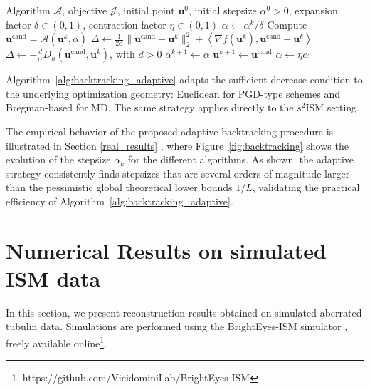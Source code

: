 \documentclass[letterpaper]{article}
\begin{document}
\begin{algorithm}
\caption{Adaptive backtracking (AB)}
\label{alg:backtracking_adaptive}
\begin{algorithmic}[1]
\Require Algorithm $\mathcal A$, objective $\mathcal J$, initial point $\mathbf u^0$, initial stepsize $\alpha^0>0$, expansion factor $\delta\in(0,1)$, contraction factor $\eta\in(0,1)$
    \State $\alpha \gets \alpha^k/\delta$
    \Repeat
        \State Compute $\mathbf u^{\mathrm{cand}}=\mathcal A(\mathbf u^k,\alpha)$
            \State $\Delta \gets \frac{1}{2\alpha}\|\mathbf u^{\mathrm{cand}}-\mathbf u^k\|_2^2
            +\left\langle \nabla f(\mathbf u^k),\mathbf u^{\mathrm{cand}}-\mathbf u^k\right\rangle$
            \State $\Delta \gets -\frac{d}{\alpha}D_h(\mathbf u^{\mathrm{cand}},\mathbf u^k)$, with $d>0$
        \EndIf
            \State $\alpha^{k+1}\gets\alpha$
            \State $\mathbf u^{k+1}\gets\mathbf u^{\mathrm{cand}}$
        \Else
            \State $\alpha\gets\eta\alpha$
        \EndIf
\EndFor
\end{algorithmic}
\end{algorithm}

Algorithm~\ref{alg:backtracking_adaptive} adapts the sufficient decrease condition to the underlying optimization geometry: Euclidean for PGD-type schemes and Bregman-based for MD. The same strategy applies directly to the $s^2$ISM setting. 

The empirical behavior of the proposed adaptive backtracking procedure is illustrated in Section \ref{real_results} , where Figure~\ref{fig:backtracking} shows the evolution of the stepsize $\alpha_k$ for the different algorithms. As shown, the adaptive strategy consistently finds stepsizes that are several orders of magnitude larger than the pessimistic global theoretical lower bounds $1/L$, validating the practical efficiency of Algorithm~\ref{alg:backtracking_adaptive}. 

\section{Numerical Results on simulated ISM data}


In this section, we present reconstruction results obtained on simulated aberrated tubulin data. Simulations are performed using the BrightEyes-ISM simulator \cite{zunino2023open}, freely available online\footnote{https://github.com/VicidominiLab/BrightEyes-ISM}.
\end{document}
